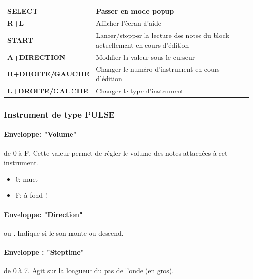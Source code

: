 \documentclass[12pt,a4paper]{article}
\begin{document}
    \tablelasttail{\hline}
    \begin{supertabular}{|l|p{11cm}|}
    \hline
        {\bf SELECT} & Passer en mode popup \\
        \hline
        {\bf R+L} & Afficher l'écran d'aide \\
        \hline
        {\bf START} & Lancer/stopper la lecture des notes du block actuellement en cours d'édition \\
        \hline
        {\bf A+DIRECTION} & Modifier la valeur sous le curseur \\
        \hline
        {\bf R+DROITE/GAUCHE} & Changer le numéro d'instrument en cours d'édition \\
        \hline
        {\bf L+DROITE/GAUCHE} & Changer le type d'instrument \\
    \hline
    \end{supertabular}

    \subsubsection{Instrument de type PULSE}
        

    \paragraph{Enveloppe: "Volume"} de 0 à F.
    Cette valeur permet de régler le volume des notes attachées à cet instrument.
    \medskip

    \begin{itemize}
        \item{0: muet}
        \item{F: à fond !}
    \end{itemize}

    \paragraph{Enveloppe: "Direction"}  ou .
    Indique si le son monte ou descend.

    \paragraph{Enveloppe : "Steptime"} de 0 à 7.
    Agit sur la longueur du pas de l'onde (en gros).
    \medskip
\end{document}
